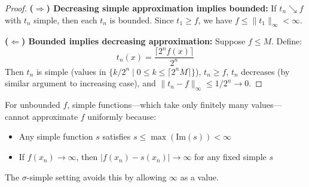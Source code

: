 \begin{proof}
    \textbf{($\Rightarrow$) Decreasing simple approximation implies bounded:}
    If $t_n \searrow f$ with $t_n$ simple, then each $t_n$ is bounded.
    Since $t_1 \geq f$, we have $f \leq \|t_1\|_\infty < \infty$.
    
    \textbf{($\Leftarrow$) Bounded implies decreasing approximation:}
    Suppose $f \leq M$. Define:
    \[
        t_n(x) = \frac{\lceil 2^n f(x) \rceil}{2^n}
    \]
    Then $t_n$ is simple (values in $\{k/2^n \mid 0 \leq k \leq \lceil 2^n M \rceil\}$), 
    $t_n \geq f$, $t_n$ decreases (by similar argument to increasing case), 
    and $\|t_n - f\|_\infty \leq 1/2^n \to 0$.
\end{proof}

\begin{remark}
    For unbounded $f$, simple functions---which take only finitely many values---cannot 
    approximate $f$ uniformly because:
    \begin{itemize}
        \item Any simple function $s$ satisfies $s \leq \max(\text{Im}(s)) < \infty$
        \item If $f(x_n) \to \infty$, then $|f(x_n) - s(x_n)| \to \infty$ for any fixed simple $s$
    \end{itemize}
    The $\sigma$-simple setting avoids this by allowing $\infty$ as a value.
\end{remark}

